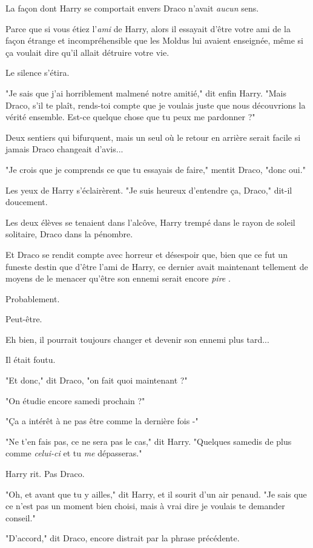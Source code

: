 La façon dont Harry se comportait envers Draco n'avait \emph{aucun}  sens.

Parce que si vous étiez l'\emph{ami}  de Harry, alors il essayait d'être votre ami de la façon étrange et incompréhensible que les Moldus lui avaient enseignée, même si ça voulait dire qu'il allait détruire votre vie.

Le silence s'étira.

"Je sais que j'ai horriblement malmené notre amitié," dit enfin Harry. "Mais Draco, s'il te plaît, rends-toi compte que je voulais juste que nous découvrions la vérité ensemble. Est-ce quelque chose que tu peux me pardonner ?"

Deux sentiers qui bifurquent, mais un seul où le retour en arrière serait facile si jamais Draco changeait d'avis...

"Je crois que je comprends ce que tu essayais de faire," mentit Draco, "donc oui."

Les yeux de Harry s'éclairèrent. "Je suis heureux d'entendre ça, Draco," dit-il doucement.

Les deux élèves se tenaient dans l'alcôve, Harry trempé dans le rayon de soleil solitaire, Draco dans la pénombre.

Et Draco se rendit compte avec horreur et désespoir que, bien que ce fut un funeste destin que d'être l'ami de Harry, ce dernier avait maintenant tellement de moyens de le menacer qu'être son ennemi serait encore \emph{pire} .

Probablement.

Peut-être.

Eh bien, il pourrait toujours changer et devenir son ennemi plus tard...

Il était foutu.

"Et donc," dit Draco, "on fait quoi maintenant ?"

"On étudie encore samedi prochain ?"

"Ça a intérêt à ne pas être comme la dernière fois -"

"Ne t'en fais pas, ce ne sera pas le cas," dit Harry. "Quelques samedis de plus comme \emph{celui-ci}  et tu \emph{me}  dépasseras."

Harry rit. Pas Draco.

"Oh, et avant que tu y ailles," dit Harry, et il sourit d'un air penaud. "Je sais que ce n'est pas un moment bien choisi, mais à vrai dire je voulais te demander conseil."

"D'accord," dit Draco, encore distrait par la phrase précédente.

